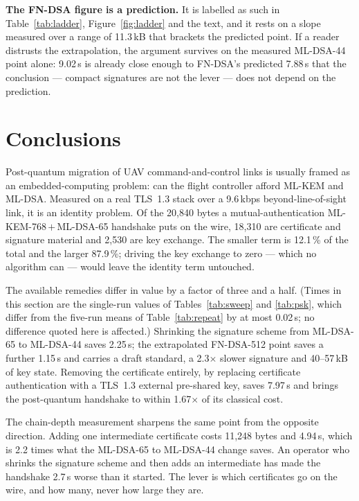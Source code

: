 \documentclass[drones,article,submit,pdftex,moreauthors]{Definitions/mdpi}
\newcommand{\kbps}{kbps}
\newcommand{\mlkem}{ML-KEM}
\newcommand{\mldsa}{ML-DSA}
\newcommand{\fndsa}{FN-DSA}
\newcommand{\tls}{TLS}
\begin{document}
\textbf{The \fndsa{} figure is a prediction.} It is labelled as such in
Table~\ref{tab:ladder}, Figure~\ref{fig:ladder} and the text, and it
rests on a slope measured over a range of 11.3\,kB that brackets the
predicted point. If a reader distrusts the extrapolation, the argument
survives on the measured \mldsa{}-44 point alone: 9.02\,s is already
close enough to \fndsa{}'s predicted 7.88\,s that the conclusion ---
compact signatures are not the lever --- does not depend on the
prediction.

\section{Conclusions}

Post-quantum migration of UAV command-and-control links is usually
framed as an embedded-computing problem: can the flight controller
afford \mlkem{} and \mldsa{}. Measured on a real \tls{}~1.3 stack over a
9.6\,\kbps{} beyond-line-of-sight link, it is an identity problem. Of the
20{,}840 bytes a mutual-authentication \mlkem{}-768\,$+$\,\mldsa{}-65
handshake puts on the wire, 18{,}310 are certificate and signature
material and 2{,}530 are key exchange. The smaller term is 12.1\,\% of
the total and the larger 87.9\,\%; driving the key exchange to zero ---
which no algorithm can --- would leave the identity term untouched.

The available remedies differ in value by a factor of three and a half.
(Times in this section are the single-run values of
Tables~\ref{tab:sweep} and \ref{tab:psk}, which differ from the
five-run means of Table~\ref{tab:repeat} by at most 0.02\,s; no
difference quoted here is affected.) Shrinking the signature scheme
from \mldsa{}-65 to \mldsa{}-44 saves
2.25\,s; the extrapolated \fndsa{}-512 point saves a further 1.15\,s and
carries a draft standard, a 2.3$\times$ slower signature and 40--57\,kB
of key state. Removing the certificate entirely, by replacing
certificate authentication with a \tls{}~1.3 external pre-shared key,
saves 7.97\,s and brings the post-quantum handshake to within
1.67$\times$ of its classical cost.

The chain-depth measurement sharpens the same point from the opposite
direction. Adding one intermediate certificate costs 11{,}248 bytes and
4.94\,s, which is 2.2 times what the \mldsa{}-65 to \mldsa{}-44 change
saves. An operator who shrinks the signature scheme and then adds an
intermediate has made the handshake 2.7\,s worse than it started. The
lever is which certificates go on the wire, and how many, never how
large they are.
\end{document}
